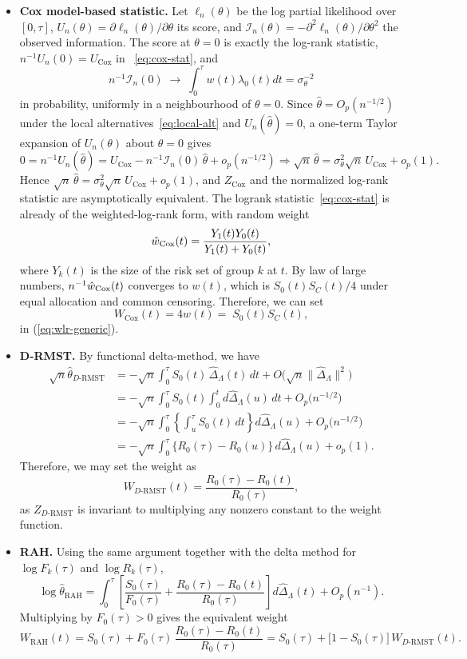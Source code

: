 \documentclass[12pt]{article}
\newcommand{\RAH}{\mathrm{RAH}}
\newcommand{\DRMST}{D\text{-}\mathrm{RMST}}
\newcommand{\dd}{\,d}
\begin{document}
\begin{itemize}
\item \textbf{Cox model-based statistic.}
  Let
\(\ell_n(\theta)\) be the log partial likelihood over \([0, \tau]\),
\(U_n(\theta)=\partial\ell_n(\theta)/\partial\theta\) its score, and
\(\mathcal I_n(\theta)=-\partial^2\ell_n(\theta)/\partial\theta^2\) the
observed information.  The score at \(\theta=0\) is exactly the log-rank
statistic, \(n^{-1}U_n(0)=U_{\mathrm{Cox}}\) in ~\eqref{eq:cox-stat}, and
\[
  n^{-1}\mathcal I_n(0)
    \;\longrightarrow\;
  \int_0^{\tau}w(t)\lambda_0(t)dt=\sigma_\theta^{-2}
\]
in probability, uniformly in a neighbourhood of \(\theta=0\).  Since
\(\hat\theta=O_p(n^{-1/2})\) under the local
alternatives~\eqref{eq:local-alt} and \(U_n(\hat\theta)=0\), a one-term
Taylor expansion of \(U_n(\theta)\) about \(\theta=0\) gives
\[
  0=n^{-1}U_n(\hat\theta)
   =U_{\mathrm{Cox}}-n^{-1}\mathcal I_n(0)\,\hat\theta+o_p(n^{-1/2})
  \Rightarrow
  \sqrt n\,\hat\theta=\sigma_\theta^{2}\sqrt n\,U_{\mathrm{Cox}}+o_p(1).
\]
Hence \(\sqrt n\,\hat\theta=\sigma_\theta^2\sqrt n\,U_{\mathrm{Cox}}+o_p(1)\), and \(Z_{\mathrm{Cox}}\) and the normalized log-rank statistic are
asymptotically equivalent.  The logrank statistic~\eqref{eq:cox-stat} is
already of the weighted-log-rank form, with random weight
\[
 \hat{w}_{\rm{Cox}}(t)=\frac{Y_1(t)Y_0(t)}{Y_1(t)+Y_0(t)},
\]
where $Y_k(t)$ is the size of the risk set of group $k$ at $t.$  By law of large numbers, $n^{-1}\hat{w}_{\rm{Cox}}(t)$ converges to \(w(t)\), which is $S_0(t)S_C(t)/4$ under equal
allocation and common censoring. Therefore, we can set
\[
  W_{\mathrm{Cox}}(t)=4w(t)=\;S_0(t)S_C(t),
\]
in (\ref{eq:wlr-generic}).


\item \textbf{D-RMST.}
By functional delta-method, we have
\begin{align*}
  \sqrt{n}\hat\theta_{\DRMST}&=-\sqrt{n}\int_0^\tau S_0(t)\,\hat{\Delta}_\Lambda(t)\dd t+O\bigl(\sqrt{n}\|\hat{\Delta}_\Lambda\|^2\bigr)\\
  &=-\sqrt{n}\int_0^\tau S_0(t)\int_0^t d\hat{\Delta}_\Lambda(u)\dd t+O_p\bigl(n^{-1/2}\bigr)\\
  &=-\sqrt{n}\int_0^\tau\left\{\int_u^\tau S_0(t)\dd t\right\}d\hat{\Delta}_\Lambda(u)+O_p\bigl(n^{-1/2}\bigr)\\
  &=-\sqrt{n}\int_0^\tau\{R_0(\tau)-R_0(u)\}\,d\hat{\Delta}_\Lambda(u)+o_p(1).
\end{align*}
Therefore, we may set the weight as
\[
  W_{\DRMST}(t)=\frac{R_0(\tau)-R_0(t)}{R_0(\tau)},
\]
as $Z_{\DRMST}$ is invariant to multiplying any nonzero constant to the weight function.


\item \textbf{RAH.}
Using the same argument together with the delta method for $\log F_k(\tau)$ and $\log R_k(\tau)$,
\[
\log\hat\theta_{\RAH}=\int_0^\tau\left[\frac{S_0(\tau)}{F_0(\tau)}+\frac{R_0(\tau)-R_0(t)}{R_0(\tau)}\right]d\hat\Delta_\Lambda(t)+O_p(n^{-1}).
\]
Multiplying by $F_0(\tau)>0$ gives the equivalent weight
\[
  W_{\RAH}(t)
    =S_0(\tau)+F_0(\tau)\,\frac{R_0(\tau)-R_0(t)}{R_0(\tau)}
    =S_0(\tau)+\bigl[1-S_0(\tau)\bigr]\, W_{\DRMST}(t).
\]
\end{itemize}
\end{document}
